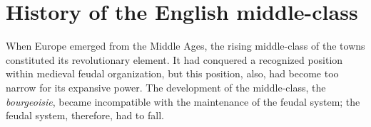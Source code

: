 \section*{History of the English middle-class}

When Europe emerged from the Middle Ages, the rising middle-class of the towns
constituted its revolutionary element. It had conquered a recognized position
within medieval feudal organization, but this position, also, had become too
narrow for its expansive power. The development of the middle-class, the
\emph{bourgeoisie}, became incompatible with the maintenance of the feudal
system; the feudal system, therefore, had to fall.

